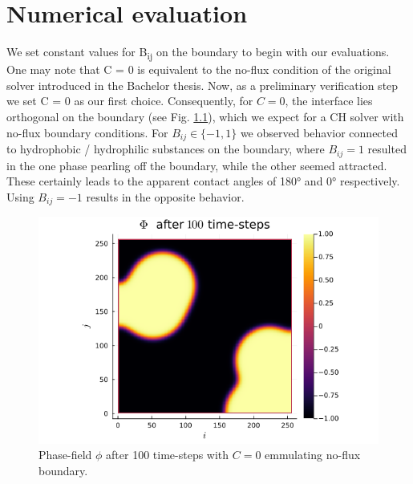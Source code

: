 \documentclass{mimosis}
\begin{document}
\chapter{Numerical evaluation}
\label{sec:orgb961127}
We set constant values for B\textsubscript{ij} on the boundary to begin with our evaluations.
One may note that C = 0 is equivalent to the no-flux condition of the original solver introduced in the Bachelor thesis. Now, as a preliminary verification step we set C = 0 as our first choice.
Consequently, for \(C = 0\), the interface lies orthogonal on the boundary (see Fig. \ref{fig:angle0}), which we expect for a CH solver with no-flux boundary conditions.
For \(B_{ij} \in \{-1,1\}\) we observed behavior connected to hydrophobic / hydrophilic substances on the boundary, where \(B_{ij}=1\) resulted in the one phase pearling off the boundary, while the other seemed attracted. These certainly leads to the apparent contact angles of 180° and 0° respectively. Using \(B_{ij} = -1\) results in the opposite behavior.

\begin{figure}[htbp]
\centering
\includegraphics[width=.9\linewidth]{images/baseline.png}
\caption{\label{fig:angle0}Phase-field \(\phi\) after 100 time-steps with \(C=0\) emmulating no-flux boundary.}
\end{figure}
\end{document}

